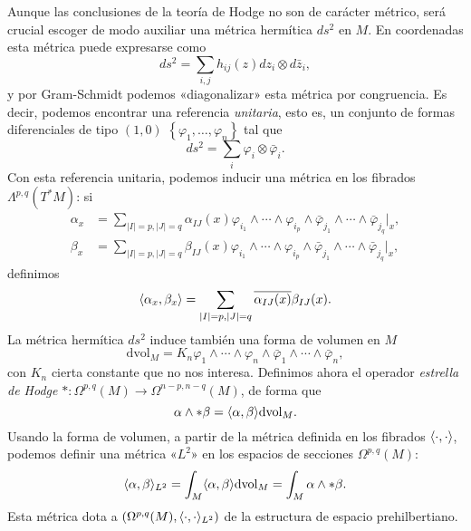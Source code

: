 \documentclass[12pt,a4paper]{article}
\theoremstyle{definition} \newtheorem{defn}[thm]{Definición}
\theoremstyle{definition} \newtheorem{ejemplo}[thm]{Ejemplo}
\theoremstyle{definition} \newtheorem{ejercicio}[thm]{Ejercicio}
\theoremstyle{remark} \newtheorem*{obs}{Observación}
\DeclarePairedDelimiter\esc{\langle}{\rangle}
\newcommand{\dvol}{\mathrm{dvol}}
\begin{document}
 Aunque las conclusiones de la teoría de Hodge no son de carácter métrico, será crucial escoger de modo auxiliar una métrica hermítica $ds^2$ en $M$. En coordenadas esta métrica puede expresarse como
 \begin{equation*}
   ds^2=\sum_{i,j} h_{ij}(z) dz_i \otimes d\bar{z}_i,
 \end{equation*}
 y por Gram-Schmidt podemos «diagonalizar» esta métrica por congruencia. Es decir, podemos encontrar una referencia \emph{unitaria}, esto es, un conjunto de formas diferenciales de tipo $(1,0)$ $\left\{ \varphi_1,\dots,\varphi_n \right\}$ tal que 
 \begin{equation*}
   ds^2=\sum_i \varphi_i \otimes \bar{\varphi}_i.
 \end{equation*}
 Con esta referencia unitaria, podemos inducir una métrica en los fibrados $\Lambda^{p,q}(T^*M)$: si 
 \begin{align*}
   \alpha_x&= \sum_{|I|=p, |J|=q} \alpha_{IJ}(x) \varphi_{i_1} \wedge \cdots \wedge \varphi_{i_p} \wedge \bar{\varphi}_{j_1} \wedge \cdots \wedge \bar{\varphi}_{j_q}|_x, \\
   \beta_x&= \sum_{|I|=p, |J|=q} \beta_{IJ}(x) \varphi_{i_1} \wedge \cdots \wedge \varphi_{i_p} \wedge \bar{\varphi}_{j_1} \wedge \cdots \wedge \bar{\varphi}_{j_q}|_x ,
 \end{align*}
  definimos
  \begin{equation*}
    \esc{\alpha_x,\beta_x}=\sum_{|I|=p, |J|=q} \overline{\alpha_{IJ}(x)} \beta_{IJ}(x)   .
  \end{equation*}
  La métrica hermítica $ds^2$ induce también una forma de volumen en $M$
  \begin{equation*}
    \dvol_M=K_n \varphi_1 \wedge \cdots \wedge \varphi_n \wedge \bar{\varphi}_1 \wedge \cdots \wedge \bar{\varphi}_n,
  \end{equation*}
  con $K_n$ cierta constante que no nos interesa.
  Definimos ahora el operador \emph{estrella de Hodge} $*:\Omega^{p,q}(M) \rightarrow \Omega^{n-p,n-q}(M)$, de forma que
  \begin{equation*}
    \alpha \wedge *\beta = \esc{\alpha,\beta} \dvol_M.
  \end{equation*}
  Usando la forma de volumen, a partir de la métrica definida en los fibrados $\esc{\cdot,\cdot}$, podemos definir una métrica «$L^2$» en los espacios de secciones $\Omega^{p,q}(M)$:
  \begin{equation*}
    \esc{\alpha,\beta}_{L^2}=\int_M \esc{\alpha,\beta} \dvol_M = \int_M \alpha \wedge *\beta.
  \end{equation*}
  Esta métrica dota a $(\Omega^{p,q}(M), \esc{\cdot,\cdot}_{L^2})$ de la estructura de espacio prehilbertiano. 
\end{document}
